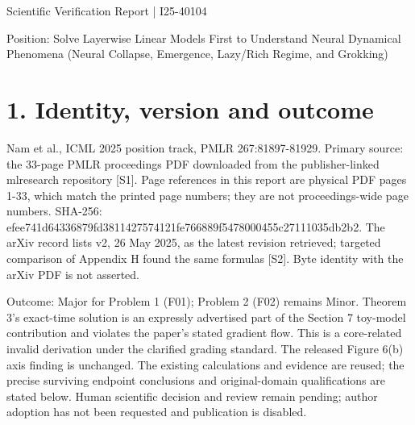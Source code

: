 \documentclass[10pt]{article}
\begin{document}
Scientific Verification Report | I25-40104\par
Position: Solve Layerwise Linear Models First to Understand Neural Dynamical Phenomena (Neural Collapse, Emergence, Lazy/Rich Regime, and Grokking)\par
\section*{1. Identity, version and outcome}
Nam et al., ICML 2025 position track, PMLR 267:81897-81929. Primary source: the 33-page PMLR proceedings PDF downloaded from the publisher-linked mlresearch repository [S1]. Page references in this report are physical PDF pages 1-33, which match the printed page numbers; they are not proceedings-wide page numbers. SHA-256: efee741d64336879fd3811427574121fe766889f5478000455c27111035db2b2. The arXiv record lists v2, 26 May 2025, as the latest revision retrieved; targeted comparison of Appendix H found the same formulas [S2]. Byte identity with the arXiv PDF is not asserted.\par
Outcome: Major for Problem 1 (F01); Problem 2 (F02) remains Minor. Theorem 3’s exact-time solution is an expressly advertised part of the Section 7 toy-model contribution and violates the paper’s stated gradient flow. This is a core-related invalid derivation under the clarified grading standard. The released Figure 6(b) axis finding is unchanged. The existing calculations and evidence are reused; the precise surviving endpoint conclusions and original-domain qualifications are stated below. Human scientific decision and review remain pending; author adoption has not been requested and publication is disabled.\par
\end{document}
